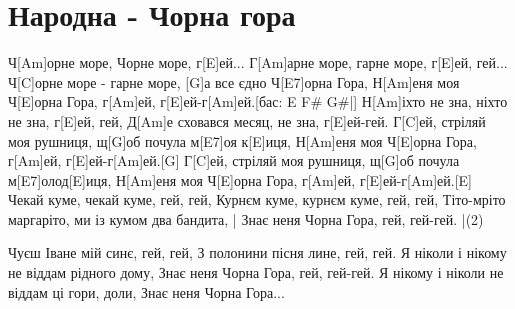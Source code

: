 \section{Народна - Чорна гора}
\begin{guitar}
Ч[Am]орне море, Чорне море, г[E]ей...
Г[Am]арне море, гарне море, г[E]ей, гей...
Ч[C]орне море - гарне море, [G]а все єдно Ч[E7]орна Гора,
Н[Am]еня моя Ч[E]орна Гора, г[Am]ей, г[E]ей-г[Am]ей.[бас: E F# G#|] 
\guitarEndLine
Н[Am]іхто не зна, ніхто не зна, г[E]ей, гей,
Д[Am]е сховався месяц, не зна, г[E]ей-гей.
Г[C]ей, стріляй моя рушниця, щ[G]об почула м[E7]оя к[E]иця,
Н[Am]еня моя Ч[E]орна Гора, г[Am]ей, г[E]ей-г[Am]ей.[G] \guitarEndLine
Г[C]ей, стріляй моя рушниця, щ[G]об почула м[E7]олод[E]иця,
Н[Am]еня моя Ч[E]орна Гора, г[Am]ей, г[E]ей-г[Am]ей.[E] 
\guitarEndLine
Чекай куме, чекай куме, гей, гей,
Курнєм куме, курнєм куме, гей, гей,
Тіто-мріто маргаріто, ми із кумом два бандита, |
Знає неня Чорна Гора, гей, гей-гей.            |(2)

Чуєш Іване мій синє, гей, гей,
З полонини пісня лине, гей, гей.
Я ніколи і нікому не віддам рідного дому,
Знає неня Чорна Гора, гей, гей-гей.
Я нікому і ніколи не віддам ці гори, доли,
Знає неня Чорна Гора...
\end{guitar}